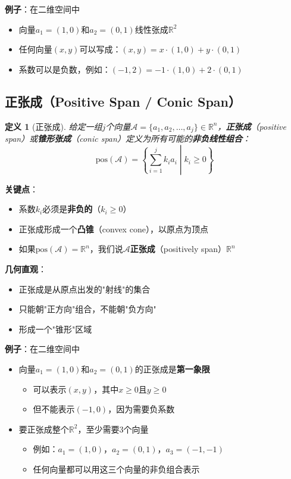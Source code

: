 \documentclass[12pt,a4paper]{article}
\newtheorem{definition}{定义}
\begin{document}
\textbf{例子}：在二维空间中
\begin{itemize}
\item 向量$a_1 = (1, 0)$和$a_2 = (0, 1)$线性张成$\mathbb{R}^2$
\item 任何向量$(x, y)$可以写成：$(x, y) = x \cdot (1, 0) + y \cdot (0, 1)$
\item 系数可以是负数，例如：$(-1, 2) = -1 \cdot (1, 0) + 2 \cdot (0, 1)$
\end{itemize}

\subsection{正张成（Positive Span / Conic Span）}

\begin{definition}[正张成]
给定一组$j$个向量$\mathcal{A} = \{a_1, a_2, \ldots, a_j\} \in \mathbb{R}^n$，\textbf{正张成}（positive span）或\textbf{锥形张成}（conic span）定义为所有可能的\textbf{非负线性组合}：
\begin{equation}
\text{pos}(\mathcal{A}) = \left\{\sum_{i=1}^j k_i a_i \middle| k_i \geq 0 \right\}
\label{eq:positive_span}
\end{equation}
\end{definition}

\textbf{关键点}：
\begin{itemize}
\item 系数$k_i$必须是\textbf{非负的}（$k_i \geq 0$）
\item 正张成形成一个\textbf{凸锥}（convex cone），以原点为顶点
\item 如果$\text{pos}(\mathcal{A}) = \mathbb{R}^n$，我们说$\mathcal{A}$\textbf{正张成}（positively span）$\mathbb{R}^n$
\end{itemize}

\textbf{几何直观}：
\begin{itemize}
\item 正张成是从原点出发的"射线"的集合
\item 只能朝"正方向"组合，不能朝"负方向"
\item 形成一个"锥形"区域
\end{itemize}

\textbf{例子}：在二维空间中
\begin{itemize}
\item 向量$a_1 = (1, 0)$和$a_2 = (0, 1)$的正张成是\textbf{第一象限}
  \begin{itemize}
  \item 可以表示$(x, y)$，其中$x \geq 0$且$y \geq 0$
  \item 但不能表示$(-1, 0)$，因为需要负系数
  \end{itemize}
\item 要正张成整个$\mathbb{R}^2$，至少需要3个向量
  \begin{itemize}
  \item 例如：$a_1 = (1, 0)$，$a_2 = (0, 1)$，$a_3 = (-1, -1)$
  \item 任何向量都可以用这三个向量的非负组合表示
  \end{itemize}
\end{itemize}
\end{document}

